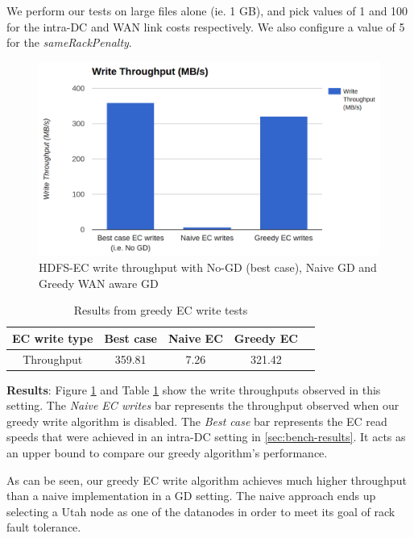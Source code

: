 \documentclass{sig-alternate-05-2015}
\begin{document}
We perform our tests on large files alone (ie. 1 GB), and pick values of 1 and 100 for the intra-DC and WAN link costs respectively. We also configure a value of 5 for the \emph{sameRackPenalty}. \\

\begin{figure}
\centering
\includegraphics[scale=0.21]{greedy_write_tput.png}
\caption{HDFS-EC write throughput with No-GD (best case), Naive GD and Greedy WAN aware GD}
\label{greedyTput}
\end{figure} 

\begin{table}
\centering

\begin{tabular}{|c|c|c|c|l|} \hline
EC write type&Best case&Naive EC&Greedy EC\\ \hline
Throughput&359.81&7.26&321.42\\

\hline\end{tabular}
\caption{Results from greedy EC write tests}
\label{table:gd-writes}
\end{table}

\textbf{Results}: Figure \ref{greedyTput} and Table \ref{table:gd-writes} show the write throughputs observed in this setting. The \emph{Naive EC writes} bar represents the throughput observed when our greedy write algorithm is disabled. The \emph{Best case} bar represents the EC read speeds that were achieved in an intra-DC setting in \ref{sec:bench-results}. It acts as an upper bound to compare our greedy algorithm's performance. 

As can be seen, our greedy EC write algorithm achieves much higher throughput than a naive implementation in a GD setting. The naive approach ends up selecting a Utah node as one of the datanodes in order to meet its goal of rack fault tolerance. 
\end{document}
